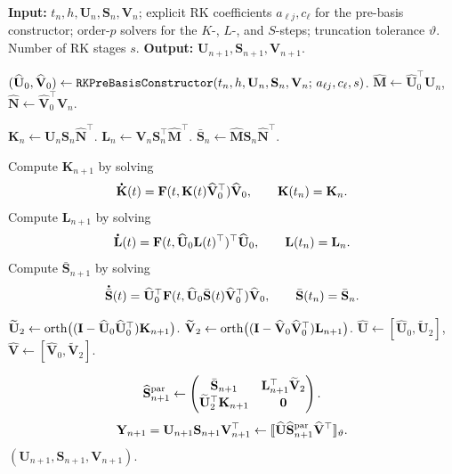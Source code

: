 \documentclass[preprint,runningheads]{svjour3}
\newcommand*{\dt}[1]{ \accentset{\mbox{\large\bfseries .}}{#1}}
\newcommand\bfI{{\mathbf I}}
\newcommand\bfF{{\mathbf F}}
\newcommand\bfK{{\mathbf K}}
\newcommand\bfL{{\mathbf L}}
\newcommand\bfM{{\mathbf M}}
\newcommand\bfN{{\mathbf N}}
\newcommand\bfS{{\mathbf S}}
\newcommand\bfU{{\mathbf U}}
\newcommand\bfV{{\mathbf V}}
\newcommand\bfY{{\mathbf Y}}
\begin{document}
\begin{algorithm}[t]
\caption{Order $p$ parallel BUG integrator (parallel BUG-$p$)}
\label{alg:parallel_bugp}
\begin{algorithmic}[1]
\State \textbf{Input:}
$t_n,h,\bfU_n,\bfS_n,\bfV_n$; explicit RK coefficients
$a_{\ell j},c_\ell$ for the pre-basis constructor; order-$p$ solvers for the
$K$-, $L$-, and $S$-steps; truncation tolerance $\vartheta$. Number of RK stages $s$.
\State \textbf{Output:}
$\bfU_{n+1},\bfS_{n+1},\bfV_{n+1}$.

\Statex
\State
$(\widehat\bfU_0,\widehat\bfV_0)
\gets
{\tt RKPreBasisConstructor}
(t_n,h,\bfU_n,\bfS_n,\bfV_n;\,a_{\ell j},c_\ell,s)$.
\State
$\widehat\bfM\gets\widehat\bfU_0^\top\bfU_n$,
$\widehat\bfN\gets\widehat\bfV_0^\top\bfV_n$.

\Statex
\State
$\bfK_n\gets \bfU_n\bfS_n\widehat\bfN^\top$.
\State
$\bfL_n\gets \bfV_n\bfS_n^\top\widehat\bfM^\top$.
\State
$\bar{\bfS}_n\gets \widehat\bfM\bfS_n\widehat\bfN^\top$.

\Statex
\State
Compute $\bfK_{n+1}$ by solving
\[
    \dt{\bfK}(t)
    =
    \bfF(t,\bfK(t)\widehat\bfV_0^\top)\widehat\bfV_0,
    \qquad
    \bfK(t_n)=\bfK_n .
\]
\State
Compute $\bfL_{n+1}$ by solving
\[
    \dt{\bfL}(t)
    =
    \bfF(t,\widehat\bfU_0\bfL(t)^\top)^\top\widehat\bfU_0,
    \qquad
    \bfL(t_n)=\bfL_n .
\]
\State
Compute $\bar{\bfS}_{n+1}$ by solving
\[
    \dt{\bar{\bfS}}(t)
    =
    \widehat\bfU_0^\top
    \bfF(t,\widehat\bfU_0\bar{\bfS}(t)\widehat\bfV_0^\top)
    \widehat\bfV_0,
    \qquad
    \bar{\bfS}(t_n)=\bar{\bfS}_n .
\]

\Statex
\State
$\widetilde\bfU_2
\gets
{\rm orth}\bigl((\bfI-\widehat\bfU_0\widehat\bfU_0^\top)\bfK_{n+1}\bigr)$.
\State
$\widetilde\bfV_2
\gets
{\rm orth}\bigl((\bfI-\widehat\bfV_0\widehat\bfV_0^\top)\bfL_{n+1}\bigr)$.
\State
$\widehat\bfU\gets[\widehat\bfU_0,\widetilde\bfU_2]$,
$\widehat\bfV\gets[\widehat\bfV_0,\widetilde\bfV_2]$.

\Statex
\State
\[
    \widehat\bfS_{n+1}^{\rm par}
    \gets
    \begin{pmatrix}
        \bar{\bfS}_{n+1}
        &
        \bfL_{n+1}^\top\widetilde\bfV_2
        \\
        \widetilde\bfU_2^\top\bfK_{n+1}
        &
        \bf0
    \end{pmatrix}.
\]
\State
\[
    \bfY_{n+1}
    =
    \bfU_{n+1}\bfS_{n+1}\bfV_{n+1}^\top
    \gets
    [\![
        \widehat\bfU
        \widehat\bfS_{n+1}^{\rm par}
        \widehat\bfV^\top
    ]\!]_{\vartheta}.
\]
\State \Return $(\bfU_{n+1},\bfS_{n+1},\bfV_{n+1})$.
\end{algorithmic}
\end{algorithm}
\end{document}

